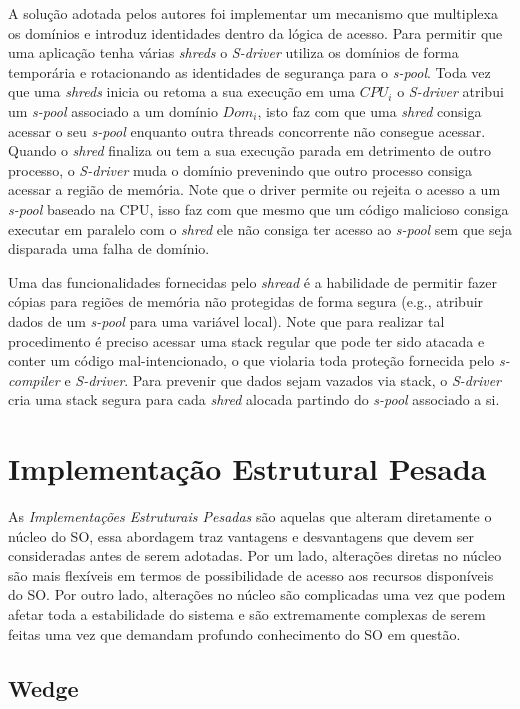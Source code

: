 A solução adotada pelos autores foi implementar um mecanismo que multiplexa os
domínios e introduz identidades dentro da lógica de acesso. Para permitir que
uma aplicação tenha várias \emph{shreds} o \emph{S-driver} utiliza os domínios
de forma temporária e rotacionando as identidades de segurança para o
\emph{s-pool}. Toda vez que uma \emph{shreds} inicia ou retoma a sua execução
em uma $CPU_i$ o \emph{S-driver} atribui um \emph{s-pool} associado a um
domínio $Dom_i$, isto faz com que uma \emph{shred} consiga acessar o seu
\emph{s-pool} enquanto outra threads concorrente não consegue acessar. Quando o
\emph{shred} finaliza ou tem a sua execução parada em detrimento de outro
processo, o \emph{S-driver} muda o domínio prevenindo que outro processo
consiga acessar a região de memória. Note que o driver permite ou rejeita o
acesso a um \emph{s-pool} baseado na CPU, isso faz com que mesmo que um código
malicioso consiga executar em paralelo com o \emph{shred} ele não consiga ter
acesso ao \emph{s-pool} sem que seja disparada uma falha de domínio.

Uma das funcionalidades fornecidas pelo \emph{shread} é a habilidade de
permitir fazer cópias para regiões de memória não protegidas de forma segura
(e.g., atribuir dados de um \emph{s-pool} para uma variável local). Note que
para realizar tal procedimento é preciso acessar uma stack regular que pode ter
sido atacada e conter um código mal-intencionado, o que violaria toda proteção
fornecida pelo \emph{s-compiler} e \emph{S-driver}. Para prevenir que dados
sejam vazados via stack, o \emph{S-driver} cria uma stack segura para cada
\emph{shred} alocada partindo do \emph{s-pool} associado a si.

\section{Implementação Estrutural Pesada}

As \textit{Implementações Estruturais Pesadas} são aquelas que alteram
diretamente o núcleo do SO, essa abordagem traz vantagens e desvantagens que
devem ser consideradas antes de serem adotadas. Por um lado, alterações diretas
no núcleo são mais flexíveis em termos de possibilidade de acesso aos recursos
disponíveis do SO. Por outro lado, alterações no núcleo são complicadas uma vez
que podem afetar toda a estabilidade do sistema e são extremamente complexas de
serem feitas uma vez que demandam profundo conhecimento do SO em questão.

\subsection{Wedge}

